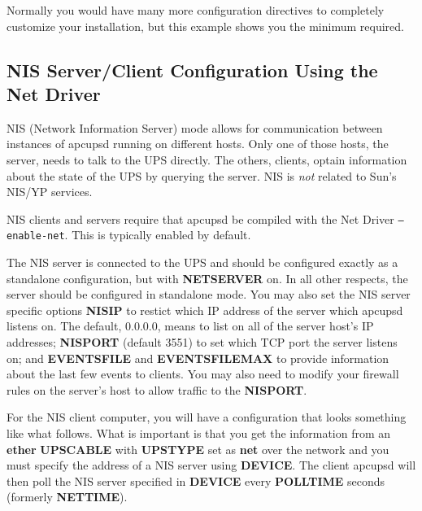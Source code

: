 Normally you would have many more configuration directives to completely
customize your installation, but this example shows you the minimum required. 

\label{A-Sample-NIS-Slave-Configuration-Using-the-Net-Driver}

\subsection*{NIS Server/Client Configuration Using the Net Driver}

\label{index-Example_002c-NIS-slave-81}
\label{index-NIS-slave-conf-82}
\label{index-Configuration_002c-NIS-slave-conf-83}

NIS (Network Information Server) mode allows for communication between
instances of apcupsd running on different hosts.  Only one of those
hosts, the server, needs to talk to the UPS directly.  The others,
clients, optain information about the state of the UPS by querying the
server.  NIS is \emph{not} related to Sun's NIS/YP services.

NIS clients and servers require that apcupsd be compiled with the Net
Driver \texttt{{---}enable-net}.  This is typically enabled by default.

The NIS server is connected to the UPS and should be configured exactly
as a standalone configuration, but with \textbf{NETSERVER} on.  In all
other respects, the server should be configured in standalone mode.  You
may also set the NIS server specific options \textbf{NISIP} to
restict which IP address of the server which apcupsd listens on.  The
default, 0.0.0.0, means to list on all of the server host's IP addresses;
\textbf{NISPORT} (default 3551) to set which TCP port the server listens on;
and \textbf{EVENTSFILE} and \textbf{EVENTSFILEMAX} to provide information
about the last few events to clients.  You may also need to modify your
firewall rules on the server's host to allow traffic to the
\textbf{NISPORT}\@.

For the NIS client computer, you will have a configuration that looks something
like what follows.  What is important is that you get the information from an
\textbf{ether} \textbf{UPSCABLE} with \textbf{UPSTYPE} set as
\textbf{net} over the network and you must specify the address of a NIS
server using \textbf{DEVICE}\@. The client apcupsd will then poll the
NIS server specified in \textbf{DEVICE} every \textbf{POLLTIME} seconds
(formerly \textbf{NETTIME}).

